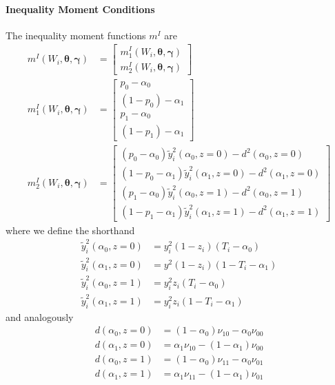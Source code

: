 \documentclass[12pt]{article}
\begin{document}
\paragraph{Inequality Moment Conditions}
The inequality moment functions $m^I$ are
\begin{align*}
  m^I(W_i, \boldsymbol{\theta}, \boldsymbol{\gamma}) &=
  \left[
  \begin{array}{l}
    m_1^I(W_i, \boldsymbol{\theta}, \boldsymbol{\gamma}) \\ 
    m_2^I(W_i, \boldsymbol{\theta}, \boldsymbol{\gamma}) 
  \end{array}
\right] \\
  m_1^I(W_i, \boldsymbol{\theta}, \boldsymbol{\gamma}) &=
  \left[
  \begin{array}{r}
  p_0 - \alpha_0 \\
  (1 - p_0) - \alpha_1  \\
  p_1 - \alpha_0 \\
  (1 - p_1) - \alpha_1  
  \end{array}
\right]\\
m_2^I(W_i, \boldsymbol{\theta}, \boldsymbol{\gamma}) &=
\left[
\begin{array}{r}
  (p_0 - \alpha_0) \widetilde{y}_i^2(\alpha_0,z=0) - d^2(\alpha_0,z=0)\\
  (1- p_0 - \alpha_1) \widetilde{y}^2_i(\alpha_1,z=0) - d^2(\alpha_1,z=0)\\
  (p_1 - \alpha_0) \widetilde{y}^2_i(\alpha_0,z=1) - d^2(\alpha_0,z=1)\\
  (1- p_1 - \alpha_1) \widetilde{y}_i^2(\alpha_1,z=1) -  d^2(\alpha_1,z=1)
\end{array}
\right]
\end{align*}
where we define the shorthand
\begin{align*}
  \widetilde{y}_i^2(\alpha_0, z=0) &= y_i^2 (1 - z_i)(T_i - \alpha_0)\\ 
  \widetilde{y}_i^2(\alpha_1, z=0) &= y^2 (1-z_i)(1 - T_i - \alpha_1) \\
  \widetilde{y}_i^2(\alpha_0, z=1) &= y^2_i z_i(T_i - \alpha_0) \\
  \widetilde{y}_i^2(\alpha_1, z=1) &= y_i^2 z_i(1 - T_i - \alpha_1)
\end{align*}
and analogously
\begin{align*}
  d(\alpha_0,z=0) &=(1 - \alpha_0) \nu_{10} - \alpha_0 \nu_{00} \\ 
  d(\alpha_1, z=0) &=\alpha_1 \nu_{10} - (1 - \alpha_1)\nu_{00} \\
  d(\alpha_0, z=1) &=(1 - \alpha_0) \nu_{11} - \alpha_0 \nu_{01} \\
  d(\alpha_1, z=1) &=\alpha_1 \nu_{11} - (1 - \alpha_1)\nu_{01}
\end{align*}
\end{document}
